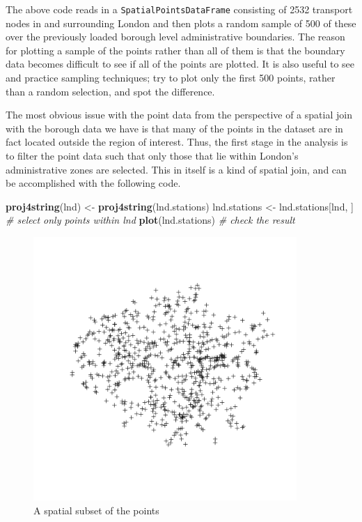 \documentclass[]{article}
\newenvironment{Shaded}{}{}
\newcommand{\KeywordTok}[1]{\textcolor[rgb]{0.00,0.44,0.13}{\textbf{{#1}}}}
\newcommand{\CommentTok}[1]{\textcolor[rgb]{0.38,0.63,0.69}{\textit{{#1}}}}
\newcommand{\NormalTok}[1]{{#1}}
\let\Oldincludegraphics\includegraphics
\renewcommand{\includegraphics}[1]{\Oldincludegraphics[width=10cm]{#1}}
\begin{document}
The above code reads in a \texttt{SpatialPointsDataFrame} consisting of
2532 transport nodes in and surrounding London and then plots a random
sample of 500 of these over the previously loaded borough level
administrative boundaries. The reason for plotting a sample of the
points rather than all of them is that the boundary data becomes
difficult to see if all of the points are plotted. It is also useful to
see and practice sampling techniques; try to plot only the first 500
points, rather than a random selection, and spot the difference.

The most obvious issue with the point data from the perspective of a
spatial join with the borough data we have is that many of the points in
the dataset are in fact located outside the region of interest. Thus,
the first stage in the analysis is to filter the point data such that
only those that lie within London's administrative zones are selected.
This in itself is a kind of spatial join, and can be accomplished with
the following code.

\begin{Shaded}
\begin{Highlighting}[]
\KeywordTok{proj4string}\NormalTok{(lnd) <- }\KeywordTok{proj4string}\NormalTok{(lnd.stations)}
\NormalTok{lnd.stations <- lnd.stations[lnd, ]  }\CommentTok{# select only points within lnd}
\KeywordTok{plot}\NormalTok{(lnd.stations)  }\CommentTok{# check the result}
\end{Highlighting}
\end{Shaded}
\begin{figure}[htbp]
\centering
\includegraphics{figure/A_spatial_subset_of_the_points.png}
\caption{A spatial subset of the points}
\end{figure}
\end{document}
